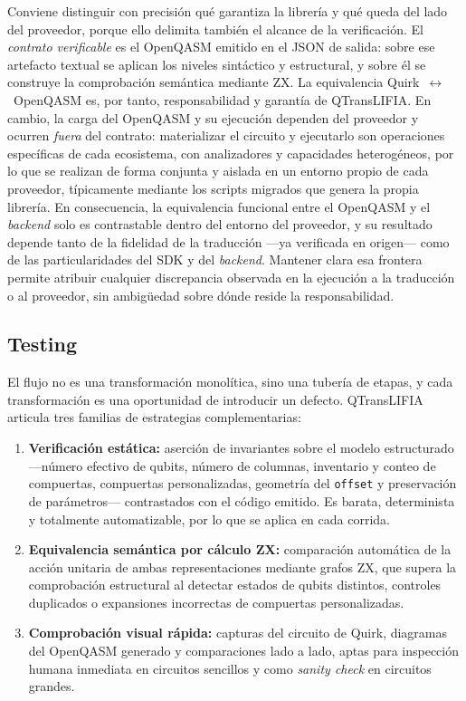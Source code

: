 \documentclass[11pt,a4paper]{article}
\newcommand{\code}[1]{\texttt{#1}}
\begin{document}
Conviene distinguir con precisión qué garantiza la librería y qué queda del lado del
proveedor, porque ello delimita también el alcance de la verificación. El \emph{contrato
verificable} es el OpenQASM emitido en el JSON de salida: sobre ese artefacto textual se
aplican los niveles sintáctico y estructural, y sobre él se construye la comprobación
semántica mediante ZX. La equivalencia Quirk~$\leftrightarrow$~OpenQASM es, por tanto,
responsabilidad y garantía de QTransLIFIA. En cambio, la carga del OpenQASM y su ejecución
dependen del proveedor y ocurren \emph{fuera} del contrato: materializar el circuito y
ejecutarlo son operaciones específicas de cada ecosistema, con analizadores y capacidades
heterogéneos, por lo que se realizan de forma conjunta y aislada en un entorno propio de cada
proveedor, típicamente mediante los scripts migrados que genera la propia librería. En
consecuencia, la equivalencia funcional entre el OpenQASM y el \emph{backend} solo es
contrastable dentro del entorno del proveedor, y su resultado depende tanto de la fidelidad
de la traducción ---ya verificada en origen--- como de las particularidades del SDK y del
\emph{backend}. Mantener clara esa frontera permite atribuir cualquier discrepancia observada
en la ejecución a la traducción o al proveedor, sin ambigüedad sobre dónde reside la
responsabilidad.

\subsection{Testing}
\label{sec:testing}

El flujo no es una transformación monolítica, sino una tubería de etapas, y cada
transformación es una oportunidad de introducir un defecto. QTransLIFIA articula tres
familias de estrategias complementarias:

\begin{enumerate}[label=(\arabic*), leftmargin=2em]
  \item \textbf{Verificación estática:} aserción de invariantes sobre el modelo estructurado
        ---número efectivo de qubits, número de columnas, inventario y conteo de compuertas,
        compuertas personalizadas, geometría del \code{offset} y preservación de
        parámetros--- contrastados con el código emitido. Es barata, determinista y
        totalmente automatizable, por lo que se aplica en cada corrida.
  \item \textbf{Equivalencia semántica por cálculo ZX:} comparación automática de la acción
        unitaria de ambas representaciones mediante grafos ZX, que supera la comprobación
        estructural al detectar estados de qubits distintos, controles duplicados o
        expansiones incorrectas de compuertas personalizadas.
  \item \textbf{Comprobación visual rápida:} capturas del circuito de Quirk, diagramas del
        OpenQASM generado y comparaciones lado a lado, aptas para inspección humana
        inmediata en circuitos sencillos y como \emph{sanity check} en circuitos grandes.
\end{enumerate}
\end{document}

